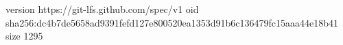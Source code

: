 version https://git-lfs.github.com/spec/v1
oid sha256:dc4b7de5658ad9391fefd127e800520ea1353d91b6c136479fc15aaa44e18b41
size 1295
